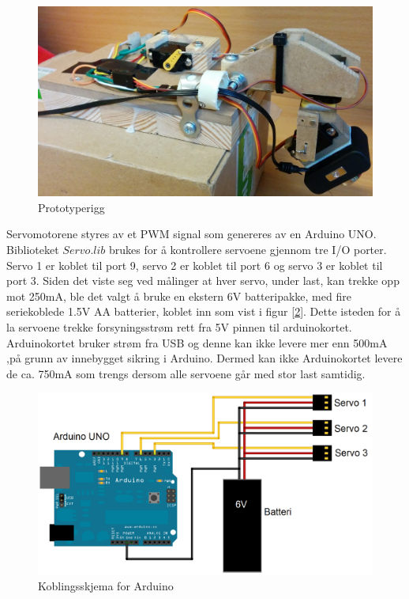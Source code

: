 \begin{figure}[h!]
	\centering
	\includegraphics[scale=0.25]{img/Rigg_Bilde.jpg}
	\caption{Prototyperigg}
	\label{fig:RiggBilde}
\end{figure}

Servomotorene styres av et PWM signal som genereres av en Arduino UNO. Biblioteket $Servo.lib$ brukes for å kontrollere servoene gjennom tre I/O porter. Servo 1 er koblet til port 9, servo 2 er koblet til port 6 og servo 3 er koblet til port 3. Siden det viste seg ved målinger at hver servo, under last, kan trekke opp mot 250mA, ble det valgt å bruke en ekstern 6V batteripakke, med fire seriekoblede 1.5V AA batterier, koblet inn som vist i figur [\ref{fig:ArduSkjem}]. Dette isteden for å la servoene trekke forsyningsstrøm rett fra 5V pinnen til arduinokortet. Arduinokortet bruker strøm fra USB og denne kan ikke levere mer enn 500mA ,på grunn av innebygget sikring i Arduino. Dermed kan ikke Arduinokortet levere de ca. 750mA som trengs dersom alle servoene går med stor last samtidig. 

\begin{figure}[h!]
	\centering
	\includegraphics[scale=0.25]{img/KoblingsskjemaArduino.png}
	\caption{Koblingsskjema for Arduino}
	\label{fig:ArduSkjem}
\end{figure}  

